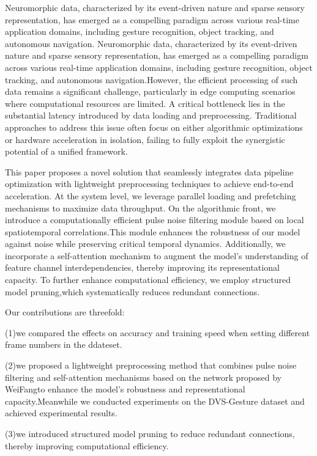 \documentclass[conference]{IEEEtran}
\begin{document}
Neuromorphic data, characterized by its event-driven nature and sparse sensory representation, has emerged as a compelling paradigm across various real-time application domains, including gesture recognition, object tracking, and autonomous navigation. Neuromorphic data, characterized by its event-driven nature and sparse sensory representation, has emerged as a compelling paradigm across various real-time application domains, including gesture recognition, object tracking, and autonomous navigation.However, the efficient processing of such data remains a significant challenge, particularly in edge computing scenarios where computational resources are limited. A critical bottleneck lies in the substantial latency introduced by data loading and preprocessing. Traditional approaches to address this issue often focus on either algorithmic optimizations or hardware acceleration in isolation, failing to fully exploit the synergistic potential of a unified framework.\cite{ding2024}

This paper proposes a novel solution that seamlessly integrates data pipeline optimization with lightweight preprocessing techniques to achieve end-to-end acceleration. At the system level, we leverage parallel loading and prefetching mechanisms to maximize data throughput. On the algorithmic front, we introduce a computationally efficient pulse noise filtering module based on local spatiotemporal correlations.This module enhances the robustness of our model against noise while preserving critical temporal dynamics. Additionally, we incorporate a self-attention mechanism to augment the model's understanding of feature channel interdependencies, thereby improving its representational capacity.\cite{hu2019} To further enhance computational efficiency, we employ structured model pruning,which systematically reduces redundant connections.\cite{han2015}

Our contributions are threefold:

(1)we compared the effects on accuracy and training speed when setting different frame numbers in the ddateset.

(2)we proposed a lightweight preprocessing method that combines pulse noise filtering and self-attention mechanisms based on the network proposed by WeiFang\cite{fang2021}to enhance the model's robustness and representational capacity.Meanwhile we conducted experiments on the DVS-Gesture dataset and achieved experimental results.

(3)we introduced structured model pruning to reduce redundant connections, thereby improving computational efficiency.
\end{document}

